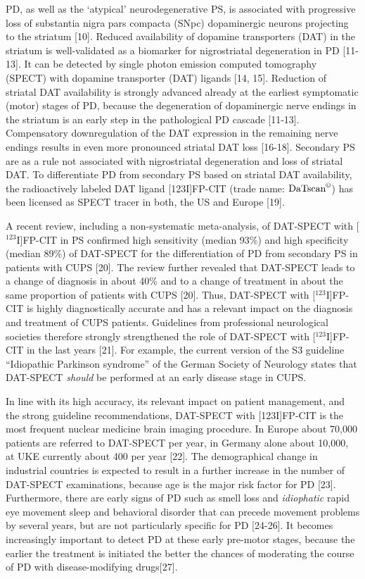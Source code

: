 PD, as well as the `atypical' neurodegenerative PS, is associated with progressive loss of substantia nigra pars compacta (SNpc) dopaminergic neurons 
projecting to the striatum [10]. 
Reduced availability of dopamine transporters (DAT) in the striatum is well-validated as a biomarker for 
nigrostriatal degeneration in PD [11-13]. 
It can be detected by single photon emission computed tomography (SPECT) with dopamine transporter (DAT) ligands [14, 15]. 
Reduction of striatal DAT availability is strongly advanced already at the earliest symptomatic (motor) stages of PD, 
because the degeneration of dopaminergic nerve endings in the striatum is an early step in the pathological PD cascade [11-13]. 
Compensatory downregulation of the DAT expression in the remaining nerve endings results in even more pronounced striatal DAT loss [16-18]. 
Secondary PS are as a rule not associated with nigrostriatal degeneration and loss of striatal DAT. 
To differentiate PD from secondary PS based on striatal DAT availability, the radioactively labeled DAT ligand [123I]FP-CIT 
(trade name: $\text{DaTscan}^{\copyright}$) has been licensed as SPECT tracer in both, the US and Europe [19].

A recent review, including a non-systematic meta-analysis, of DAT-SPECT with [$^{123}$I]FP-CIT in PS confirmed high sensitivity (median 93\%) 
and high specificity (median 89\%) of DAT-SPECT for the differentiation of PD from secondary PS in patients with CUPS [20]. 
The review further revealed that DAT-SPECT leads to a change of diagnosis in about 40\% and to a change of treatment in about the same proportion of 
patients with CUPS [20]. 
Thus, DAT-SPECT with [$^{123}$I]FP-CIT is highly diagnostically accurate and has a relevant impact on the diagnosis and treatment of CUPS patients. 
Guidelines from professional neurological societies therefore strongly strengthened the role of DAT-SPECT with [$^{123}$I]FP-CIT in the last years [21]. 
For example, the current version of the S3 guideline “Idiopathic Parkinson syndrome” of the German Society of Neurology states that DAT-SPECT 
\textit{should} be performed at an early disease stage in CUPS. 

In line with its high accuracy, its relevant impact on patient management, and the strong guideline recommendations, 
DAT-SPECT with [123I]FP-CIT is the most frequent nuclear medicine brain imaging procedure. 
In Europe about 70,000 patients are referred to DAT-SPECT per year, in Germany alone about 10,000, at UKE currently about 400 per year [22]. 
The demographical change in industrial countries is expected to result in a further increase in the number of DAT-SPECT examinations, 
because age is the major risk factor for PD [23]. 
Furthermore, there are early signs of PD such as smell loss and \textit{idiophatic} rapid eye movement sleep and behavioral disorder 
that can precede movement problems by several years, but are not particularly specific for PD [24-26]. 
It becomes increasingly important to detect PD at these early pre-motor stages, because the earlier the treatment is initiated the better 
the chances of moderating the course of PD with disease-modifying drugs[27].

